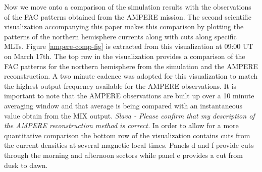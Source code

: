 \documentclass[draft,jgrga]{agutex}
\begin{document}
\begin{article}
Now we move onto a comparison of the simulation results with the observations of the FAC patterns obtained from the AMPERE mission.  The second scientific visualization accompanying this paper makes this comparison by plotting the patterns of the northern hemisphere currents along with cuts along specific MLTs. Figure \ref{ampere-comp-fig} is extracted from this visualization at 09:00 UT on March 17th.  The top row in the visualization provides a comparison of the FAC patterns for the northern hemisphere from the simulation and the AMPERE reconstruction.  A two minute cadence was adopted for this visualization to match the highest output frequency available for the AMPERE observations.  It is important to note that the AMPERE observations are built up over a 10 minute averaging window and that average is being compared with an instantaneous value obtain from the MIX output.  {\em Slava - Please confirm that my description of the AMPERE reconstruction method is correct.}  In order to allow for a more quantitative comparison the bottom row of the visualization contains cuts from the current densities at several magnetic local times.  Panels d and f provide cuts through the morning and afternoon sectors while panel e provides a cut from dusk to dawn.  


\end{article}
\end{document}
